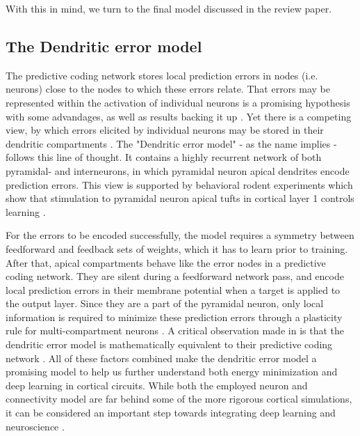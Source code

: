With this in mind, we turn to the final model discussed in the review paper.

\subsection{The Dendritic error model}

The predictive coding network stores local prediction errors in nodes (i.e. neurons) close to the nodes to which these
errors relate. That errors may be represented within the activation of individual neurons is a promising hypothesis with
some advandages, as well as results backing it up \citep{Hertaeg2022}. Yet there is a competing view, by which errors
elicited by individual neurons may be stored in their dendritic compartments \citep{guerguiev2017towards}. The
"Dendritic error model" \citep{sacramento2018dendritic} - as the name implies - follows this line of thought. It
contains a highly recurrent network of both pyramidal- and interneurons, in which pyramidal neuron apical dendrites
encode prediction errors. This view is supported by behavioral rodent experiments which show that stimulation to
pyramidal neuron apical tufts in cortical layer 1 controls learning \citep{Doron2020}.

For the errors to be encoded successfully, the model requires a symmetry between feedforward and feedback sets of
weights, which it has to learn prior to training. After that, apical compartments behave like the error nodes in a
predictive coding network. They are silent during a feedforward network pass, and encode local prediction errors in
their membrane potential when a target is applied to the output layer. Since they are a part of the pyramidal neuron,
only local information is required to minimize these prediction errors through a plasticity rule for multi-compartment
neurons \citep{urbanczik2014learning}. A critical observation made in
\citep{whittington2019theories} is that the dendritic error model is mathematically equivalent to their
predictive coding network . All of these factors combined
make the dendritic error model a promising model to help us further understand both energy minimization and deep
learning in cortical circuits. While both the employed neuron and connectivity model are far behind some of the more
rigorous cortical simulations, it can be considered an important step towards integrating deep learning and neuroscience
\citep{Marblestone2016}.

